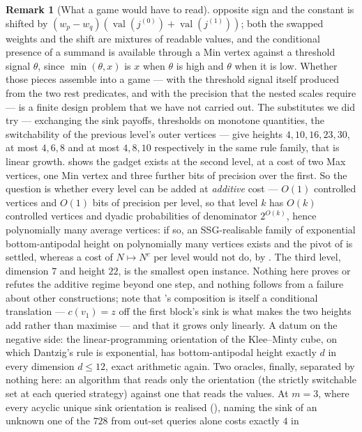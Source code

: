 \documentclass[11pt]{article}
\theoremstyle{plain}
\theoremstyle{definition}
\newtheorem{remark}[theorem]{Remark}
\DeclareMathOperator{\val}{val}
\begin{document}
\begin{remark}[What a game would have to read]
opposite sign and the constant is shifted by
$(w_p-w_q)(\val(j^{(0)})+\val(j^{(1)}))$; both the swapped weights and the
shift are mixtures of readable values, and the conditional presence of a
summand is available through a Min vertex against a threshold signal
$\theta$, since $\min(\theta,x)$ is $x$ when $\theta$ is high and $\theta$
when it is low. Whether those pieces assemble into a game --- with the
threshold signal itself produced from the two rest predicates, and with
the precision that the nested scales require --- is a finite design
problem that we have not carried out. The substitutes we did try ---
exchanging the sink payoffs, thresholds on monotone quantities, the
switchability of the previous level's outer vertices --- give heights
$4,10,16,23,30$, at most $4,6,8$ and at most $4,8,10$ respectively in the
same rule family, that is linear growth.  shows the gadget exists at the second level, at
a cost of two Max vertices, one Min vertex and three further bits of
precision over the first. So the question is whether every level can be
added at \emph{additive} cost --- $O(1)$ controlled vertices and $O(1)$
bits of precision per level, so that level $k$ has $O(k)$ controlled
vertices and dyadic probabilities of denominator $2^{O(k)}$, hence
polynomially many average vertices: if so, an SSG-realisable family of
exponential bottom-antipodal height on polynomially many vertices exists
and the pivot of  is settled, whereas a cost of
$N\mapsto N^{c}$ per level would not do, by . The
third level, dimension $7$ and height $22$, is the smallest open instance.
Nothing here proves or refutes the additive regime beyond one step, and
nothing follows from a failure about other constructions; note that
's composition is itself a conditional translation
--- $c(v_1)=z$ off the first block's sink is what makes the two heights
add rather than maximise --- and that it grows only linearly. A datum on the negative side: the linear-programming orientation of the Klee--Minty cube, on which
Dantzig's rule is exponential, has bottom-antipodal height exactly $d$ in
every dimension $d\le12$, exact arithmetic again. Two oracles, finally,
separated by nothing here: an algorithm that reads only the orientation
(the strictly switchable set at each queried strategy) against one that
reads the values. At $m=3$, where every acyclic unique sink orientation is
realised (), naming the sink of an
unknown one of the $728$ from out-set queries alone costs exactly $4$ in

\end{remark}
\end{document}
